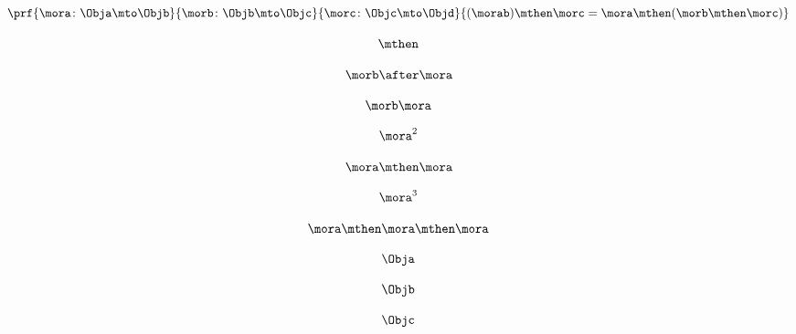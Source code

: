 \begin{forslides}
    \begin{equation}
        \label{eq:semicats-slides-63}
        \prf{
            \mora \colon \Obja \mto \Objb
        }{
            \morb\colon \Objb \mto \Objc
        }{
            \morc \colon \Objc \mto \Objd
        }{
            (\morab ) \mthen \morc = \mora \mthen ( \morb  \mthen \morc )
        }
    \end{equation}

    \begin{equation}
        \label{eq:semicats-slides-64}
        \mthen
    \end{equation}

    \begin{equation}
        \label{eq:semicats-slides-65}
        \morb\after \mora
    \end{equation}

    \begin{equation}
        \label{eq:semicats-slides-66}
        \morb \mora
    \end{equation}

    \begin{equation}
        \label{eq:semicats-slides-67}
        \mora^2
    \end{equation}

    \begin{equation}
        \label{eq:semicats-slides-68}
        \mora \mthen \mora
    \end{equation}

    \begin{equation}
        \label{eq:semicats-slides-69}
        \mora^3
    \end{equation}

    \begin{equation}
        \label{eq:semicats-slides-70}
        \mora \mthen \mora \mthen \mora
    \end{equation}

    \begin{equation}
        \label{eq:semicats-slides-71}
        \Obja
    \end{equation}

    \begin{equation}
        \label{eq:semicats-slides-72}
        \Objb
    \end{equation}

    \begin{equation}
        \label{eq:semicats-slides-73}
        \Objc
    \end{equation}


\end{forslides}
